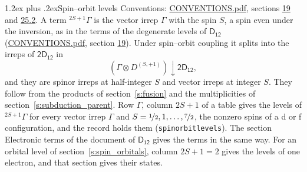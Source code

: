 \documentclass[10pt,a4paper]{article}
\makeatletter
\renewcommand\section{\@startsection{section}{1}{\z@}{-3ex plus -1ex minus -.2ex}%
  {1.2ex plus .2ex}{\normalfont\large\sffamily\bfseries\color{parttitle}}}
\numberwithin{equation}{section}
\newcommand{\grp}[1]{\mathsf{#1}}
\newcommand{\restr}[2]{#1\!\downarrow#2}
\newcommand{\irrJp}[2]{D^{(#1,#2)}}
\newcommand{\irrprod}{\otimes}
\newcommand{\term}[2]{{}^{#1}#2}
\makeatother
\begin{document}
\section{Spin--orbit levels}\label{s:spin_orbit}
Conventions: \href{../../CONVENTIONS.pdf}{CONVENTIONS.pdf}, sections \href{../../../rotation/CONVENTIONS.pdf\#conv.19}{19} and \href{../../CONVENTIONS.pdf\#conv.25.2}{25.2}.
\leavevmode\label{n:local.spin}\label{n:symbol.term}A term $\term{2S+1}{\Gamma}$ is the vector irrep $\Gamma$ with the spin $S$, a spin even under the inversion, as in the terms of the degenerate levels of \href{../../../rotation/data/pdf/D12.pdf}{$\grp{D_{12}}$} (\href{../../CONVENTIONS.pdf}{CONVENTIONS.pdf}, section \href{../../../rotation/CONVENTIONS.pdf\#conv.19}{19}). Under spin--orbit coupling it splits into the irreps of $\grp{2D_{12}}$ in
\begin{equation}\label{e:spinorbit}\restr{(\Gamma \irrprod \irrJp{S}{+1})}{\grp{2D_{12}}},\end{equation}
and they are spinor irreps at half-integer $S$ and vector irreps at integer $S$. They follow from the products of section~\ref{s:fusion} and the multiplicities of section~\ref{s:subduction_parent}. Row $\Gamma$, column $2S + 1$ of a table gives the levels of $\term{2S+1}{\Gamma}$ for every vector irrep $\Gamma$ and $S = \nicefrac{1}{2}, 1, \dots, \nicefrac{7}{2}$, the nonzero spins of a d or f configuration, and the record holds them (\texttt{spinorbitlevels}). The section Electronic terms of the document of \href{../../../rotation/data/pdf/D12.pdf}{$\grp{D_{12}}$} gives the terms in the same way. For an orbital level of section~\ref{s:spin_orbitals}, column $2S + 1 = 2$ gives the levels of one electron, and that section gives their states.
\end{document}
